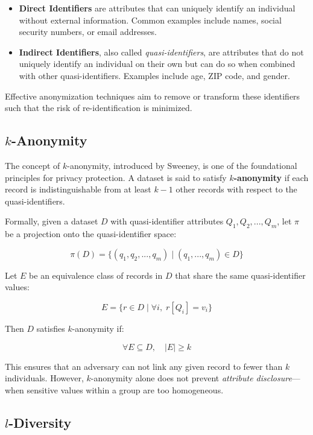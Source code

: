\documentclass{article}
\begin{document}
\begin{itemize}
\item \textbf{Direct Identifiers} are attributes that can uniquely identify an individual without external information. Common examples include names, social security numbers, or email addresses.

\item \textbf{Indirect Identifiers}, also called \textit{quasi-identifiers}, are attributes that do not uniquely identify an individual on their own but can do so when combined with other quasi-identifiers. Examples include age, ZIP code, and gender.
\end{itemize}

Effective anonymization techniques aim to remove or transform these identifiers such that the risk of re-identification is minimized.

\subsection{$k$-Anonymity}

The concept of $k$-anonymity, introduced by Sweeney, is one of the foundational principles for privacy protection. A dataset is said to satisfy \textbf{$k$-anonymity} if each record is indistinguishable from at least $k-1$ other records with respect to the quasi-identifiers.

Formally, given a dataset $D$ with quasi-identifier attributes $Q_1, Q_2, ..., Q_m$, let $\pi$ be a projection onto the quasi-identifier space:

$$
\pi(D) = \{ (q_1, q_2, ..., q_m) \mid (q_1, ..., q_m) \in D \}
$$

Let $E$ be an equivalence class of records in $D$ that share the same quasi-identifier values:

$$
E = \{ r \in D \mid \forall i, \; r[Q_i] = v_i \}
$$

Then $D$ satisfies $k$-anonymity if:

$$
\forall E \subseteq D, \quad |E| \geq k
$$

This ensures that an adversary can not link any given record to fewer than $k$ individuals. However, $k$-anonymity alone does not prevent \textit{attribute disclosure}—when sensitive values within a group are too homogeneous.

\subsection{$l$-Diversity}
\end{document}

